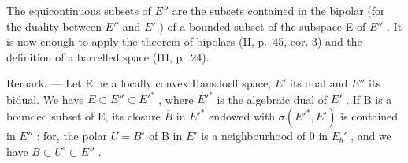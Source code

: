 The equicontinuous subsets of \(E''\) are the subsets contained in the bipolar (for the duality between \(E''\) and \(E'\) ) of a bounded subset of the subspace E of \(E''\) . It is now enough to apply the theorem of bipolars (II, p.~45, cor. 3) and the definition of a barrelled space (III, p.~24).

Remark. --- Let E be a locally convex Hausdorff space, \(E'\) its dual and \(E''\) its bidual. We have \(E \subset E'' \subset E'^{*}\) , where \(E'^{*}\) is the algebraic dual of \(E'\) . If B is a bounded subset of E, its closure \(\overline{B}\) in \(E'^{*}\) endowed with \(\sigma(E'^{*}, E')\) is contained in \(E''\) : for, the polar \(U = B^{\circ}\) of B in \(E'\) is a neighbourhood of 0 in \(E_b'\) , and we have \(\overline{B} \subset U^{\circ} \subset E''\) .

